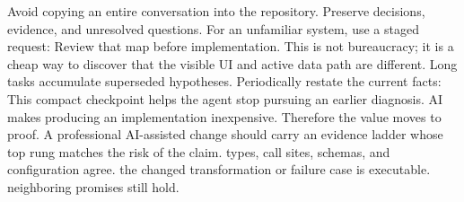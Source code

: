 {}Avoid copying an entire conversation into the repository. Preserve decisions,\markdownRendererSoftLineBreak
{}evidence, and unresolved questions.\markdownRendererInterblockSeparator
{}
\markdownRendererSectionEnd \markdownRendererSectionBegin
{}\markdownRendererInterblockSeparator
{}For an unfamiliar system, use a staged request:\markdownRendererInterblockSeparator
{}\markdownRendererInterblockSeparator
{}Review that map before implementation. This is not bureaucracy; it is a cheap\markdownRendererSoftLineBreak
{}way to discover that the visible UI and active data path are different.\markdownRendererInterblockSeparator
{}
\markdownRendererSectionEnd \markdownRendererSectionBegin
{}\markdownRendererInterblockSeparator
{}Long tasks accumulate superseded hypotheses. Periodically restate the current\markdownRendererSoftLineBreak
{}facts:\markdownRendererInterblockSeparator
{}\markdownRendererInterblockSeparator
{}This compact checkpoint helps the agent stop pursuing an earlier diagnosis.\markdownRendererInterblockSeparator
{}\markdownRendererThematicBreak{}\markdownRendererInterblockSeparator
{}
\markdownRendererSectionEnd 
\markdownRendererSectionEnd \markdownRendererSectionBegin
{}\markdownRendererInterblockSeparator
{}AI makes producing an implementation inexpensive. Therefore the value moves to\markdownRendererSoftLineBreak
{}proof. A professional AI-assisted change should carry an evidence ladder whose\markdownRendererSoftLineBreak
{}top rung matches the risk of the claim.\markdownRendererInterblockSeparator
{}\markdownRendererSectionBegin
{}\markdownRendererInterblockSeparator
{}\markdownRendererOlBegin
{} types, call sites, schemas, and configuration agree.\markdownRendererOlItemEnd 
{} the changed transformation or failure case is executable.\markdownRendererOlItemEnd 
{} neighboring promises still hold.\markdownRendererOlItemEnd 

